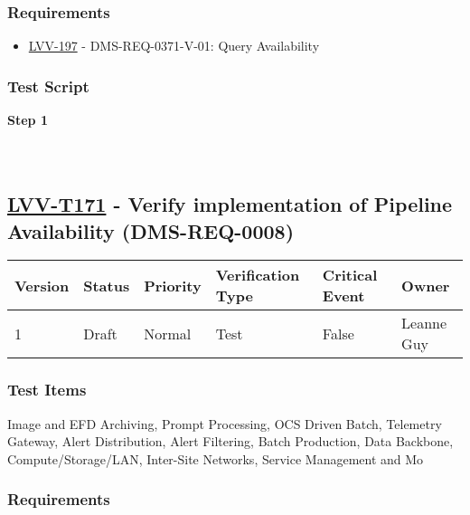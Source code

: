 \hypertarget{requirements-70}{%
\subsubsection{Requirements}\label{requirements-70}}

\begin{itemize}
\tightlist
\item
  \href{https://jira.lsstcorp.org/browse/LVV-197}{LVV-197} -
  DMS-REQ-0371-V-01: Query Availability
\end{itemize}

\hypertarget{test-script-70}{%
\subsubsection{Test Script}\label{test-script-70}}

\textbf{Step 1}\\
~\\
~\\

\hypertarget{lvv-t171---verify-implementation-of-pipeline-availability-dms-req-0008}{%
\subsection{\texorpdfstring{\href{https://jira.lsstcorp.org/secure/Tests.jspa\#/testCase/LVV-T171}{LVV-T171}
- Verify implementation of Pipeline Availability
(DMS-REQ-0008)}{LVV-T171 - Verify implementation of Pipeline Availability (DMS-REQ-0008)}}\label{lvv-t171---verify-implementation-of-pipeline-availability-dms-req-0008}}

\begin{longtable}[]{@{}llllll@{}}
\toprule
Version & Status & Priority & Verification Type & Critical Event &
Owner\tabularnewline
\midrule
\endhead
1 & Draft & Normal & Test & False & Leanne Guy\tabularnewline
\bottomrule
\end{longtable}

\hypertarget{test-items-71}{%
\subsubsection{Test Items}\label{test-items-71}}

Image and EFD Archiving, Prompt Processing, OCS Driven Batch, Telemetry
Gateway, Alert Distribution, Alert Filtering, Batch Production, Data
Backbone, Compute/Storage/LAN, Inter-Site Networks, Service Management
and Mo

\hypertarget{requirements-71}{%
\subsubsection{Requirements}\label{requirements-71}}

